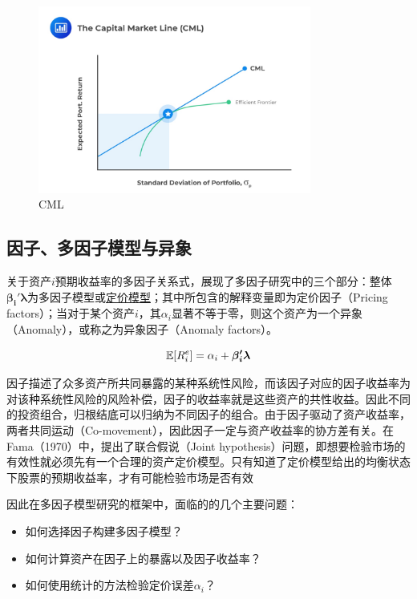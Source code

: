 \documentclass[11pt]{article}
\begin{document}
\begin{figure}[H]
    \centering
    \includegraphics[width=0.8\textwidth]{fig/cml.png}
    \caption{CML}
    \label{fig:cml}
\end{figure}

\subsection{因子、多因子模型与异象}

关于资产$i$预期收益率的多因子关系式，展现了多因子研究中的三个部分：整体$\bm{\beta_{i}' \lambda}$为多因子模型或\uline{定价模型}；其中所包含的解释变量即为定价因子（Pricing factors）；当对于某个资产$i$，其$\alpha_i$显著不等于零，则这个资产为一个异象（Anomaly），或称之为异象因子（Anomaly factors）。

\begin{equation*}
    \mathbb{E}[R_i^e] = \alpha_i + \bm{\beta_{i}' \lambda}
\end{equation*}

因子描述了众多资产所共同暴露的某种系统性风险，而该因子对应的因子收益率为对该种系统性风险的风险补偿，因子的收益率就是这些资产的共性收益。因此不同的投资组合，归根结底可以归纳为不同因子的组合。由于因子驱动了资产收益率，两者共同运动（Co-movement），因此因子一定与资产收益率的协方差有关。在Fama（1970）中，提出了联合假说（Joint hypothesis）问题，即想要检验市场的有效性就必须先有一个合理的资产定价模型。只有知道了定价模型给出的均衡状态下股票的预期收益率，才有可能检验市场是否有效

因此在多因子模型研究的框架中，面临的的几个主要问题：
\begin{itemize}
    \item 如何选择因子构建多因子模型？
    \item 如何计算资产在因子上的暴露以及因子收益率？
    \item 如何使用统计的方法检验定价误差$\alpha_i$？
\end{itemize}
\end{document}

